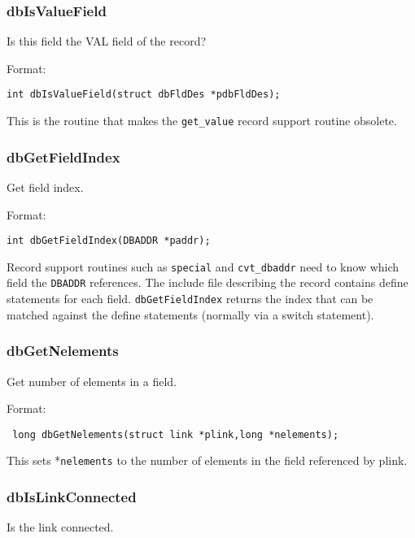 \subsubsection{dbIsValueField}

Is this field the VAL field of the record?

Format:

\begin{verbatim}int dbIsValueField(struct dbFldDes *pdbFldDes);
\end{verbatim}This is the routine that makes the \verb|get_value| record support routine obsolete.

\subsubsection{dbGetFieldIndex}

Get field index.

Format:

\begin{verbatim}int dbGetFieldIndex(DBADDR *paddr);
\end{verbatim}Record support routines such as \verb|special| and \verb|cvt_dbaddr| need to know which field the \verb|DBADDR| references. The 
include file describing the record contains define statements for each field. \verb|dbGetFieldIndex| returns the index that 
can be matched against the define statements (normally via a switch statement).

\subsubsection{dbGetNelements}

Get number of elements in a field.

Format:

\begin{verbatim} long dbGetNelements(struct link *plink,long *nelements);
\end{verbatim}This sets *\verb|nelements| to the number of elements in the field referenced by plink.

\subsubsection{dbIsLinkConnected}

Is the link connected.

